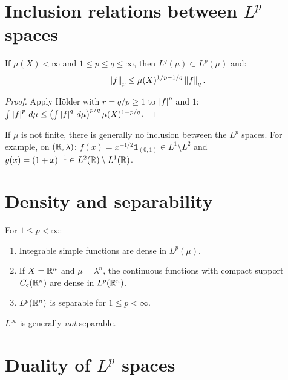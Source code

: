 \section{Inclusion relations between $L^p$ spaces}

\begin{proposition}
If $\mu(X) < \infty$ and $1 \leq p \leq q \leq \infty$, then
$L^q(\mu) \subset L^p(\mu)$ and:
\[
\left\| f \right\|_p \leq \mu(X)^{1/p - 1/q} \left\| f \right\|_q.
\]
\end{proposition}

\begin{proof}
Apply H\"older with $r = q/p \geq 1$ to $\left| f \right|^p$ and $1$:
$\int \left| f \right|^p\, d\mu \leq \left(\int \left| f \right|^q\, d\mu\right)^{p/q}
\mu(X)^{1 - p/q}$.
\end{proof}

\begin{warning}[title=\textbf{No inclusion in general}]
If $\mu$ is not finite, there is generally no inclusion between the $L^p$ spaces.
For example, on $(\mathbb{R}, \lambda)$: $f(x) = x^{-1/2}\mathbf{1}_{(0,1)} \in L^1
\setminus L^2$ and $g(x) = (1+x)^{-1} \in L^2(\mathbb{R}) \setminus L^1(\mathbb{R})$.
\end{warning}

\section{Density and separability}

\begin{theorem}
For $1 \leq p < \infty$:
\begin{enumerate}
    \item Integrable simple functions are dense in $L^p(\mu)$.
    \item If $X = \mathbb{R}^n$ and $\mu = \lambda^n$, the continuous functions with compact
    support $C_c(\mathbb{R}^n)$ are dense in $L^p(\mathbb{R}^n)$.
    \item $L^p(\mathbb{R}^n)$ is separable for $1 \leq p < \infty$.
\end{enumerate}
\end{theorem}

\begin{remark}
$L^\infty$ is generally \emph{not} separable.
\end{remark}

\section{Duality of $L^p$ spaces}

